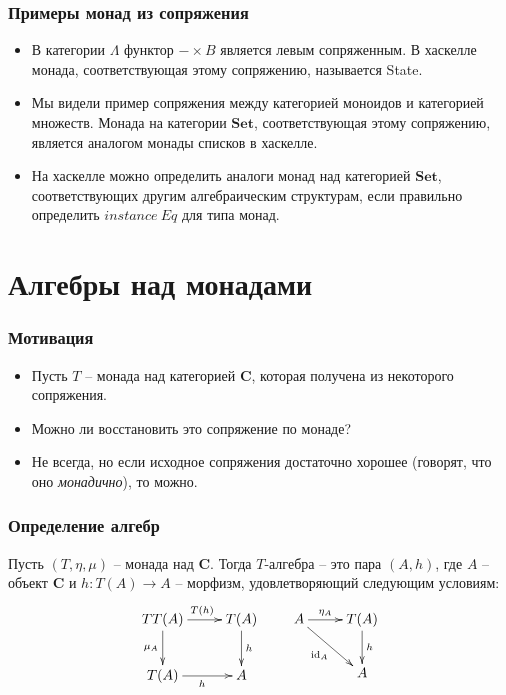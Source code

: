 \documentclass{beamer}
\theoremstyle{definition}
\newcommand{\cat}[1]{\mathbf{#1}}
\renewcommand{\C}{\cat{C}}
\newcommand{\Set}{\cat{Set}}
\newcommand{\fs}[1]{\mathrm{#1}}
\newcommand{\id}{\fs{id}}
\begin{document}
\begin{frame}
\frametitle{Примеры монад из сопряжения}
\begin{itemize}
\item В категории $\Lambda$ функтор $- \times B$ является левым сопряженным.
В хаскелле монада, соответствующая этому сопряжению, называется State.
\item Мы видели пример сопряжения между категорией моноидов и категорией множеств.
Монада на категории $\Set$, соответствующая этому сопряжению, является аналогом монады списков в хаскелле.
\item На хаскелле можно определить аналоги монад над категорией $\Set$, соответствующих другим алгебраическим структурам,
если правильно определить $\mathit{instance}\ \mathit{Eq}$ для типа монад.
\end{itemize}
\end{frame}

\section{Алгебры над монадами}

\begin{frame}
\frametitle{Мотивация}
\begin{itemize}
\item Пусть $T$ -- монада над категорией $\C$, которая получена из некоторого сопряжения.
\item Можно ли восстановить это сопряжение по монаде?
\item Не всегда, но если исходное сопряжения достаточно хорошее (говорят, что оно \emph{монадично}), то можно.
\end{itemize}
\end{frame}

\begin{frame}
\frametitle{Определение алгебр}
\begin{defn}
Пусть $(T,\eta,\mu)$ -- монада над $\C$.
Тогда $T$-алгебра -- это пара $(A,h)$, где $A$ -- объект $\C$ и $h : T(A) \to A$ -- морфизм, удовлетворяющий следующим условиям:
\[ \xymatrix{ TT(A) \ar[r]^{T(h)} \ar[d]_{\mu_A} & T(A) \ar[d]^h \\
              T(A) \ar[r]_h                      & A
            }
\qquad
   \xymatrix{ A \ar[r]^-{\eta_A} \ar[rd]_{\id_A} & T(A) \ar[d]^h \\
                                                & A
            } \]
\end{defn}
\end{frame}
\end{document}

